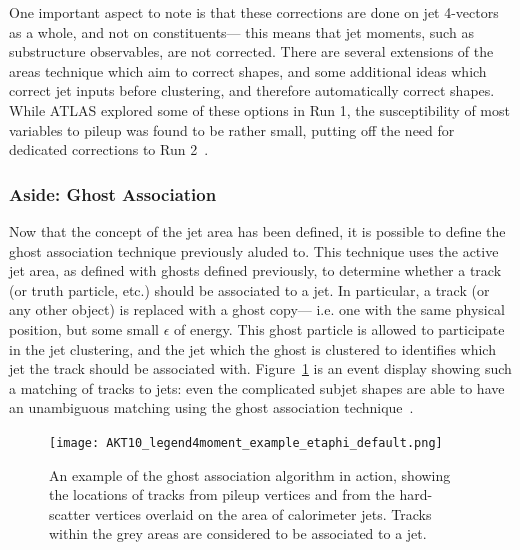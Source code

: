 One important aspect to note is that these corrections are done on jet 4-vectors as a whole, and not on constituents--- this means that jet moments, such as substructure observables, are not corrected. There are several extensions of the areas technique which aim to correct shapes, and some additional ideas which correct jet inputs before clustering, and therefore automatically correct shapes. While ATLAS explored some of these options in Run 1, the susceptibility of most variables to pileup was found to be rather small, putting off the need for dedicated corrections to Run 2~\cite{Soyez:2012hv,Berta:2014eza,Bertolini:2014bba}.



\subsubsection{Aside: Ghost Association}
\label{jet-reconstruction:pileup:ghost-association}

Now that the concept of the jet area has been defined, it is possible to define the ghost association technique previously aluded to. This technique uses the active jet area, as defined with ghosts defined previously, to determine whether a track (or truth particle, etc.) should be associated to a jet. In particular, a track (or any other object) is replaced with a ghost copy--- i.e. one with the same physical position, but some small $\epsilon$ of energy. This ghost particle is allowed to participate in the jet clustering, and the jet which the ghost is clustered to identifies which jet the track should be associated with. Figure~\ref{fig:jet-reconstruction:ghost} is an event display showing such a matching of tracks to jets: even the complicated subjet shapes are able to have an unambiguous matching using the ghost association technique~\cite{catchmentarea,ATLAS-SS-2011}.



\begin{figure}
\centering
\texttt{[image: AKT10\_legend4moment\_example\_etaphi\_default.png]}
\label{fig:jet-reconstruction:ghost}
\caption{An example of the ghost association algorithm in action, showing the locations of tracks from pileup vertices and from the hard-scatter vertices overlaid on the area of calorimeter jets. Tracks within the grey areas are considered to be associated to a jet.}
\end{figure}




